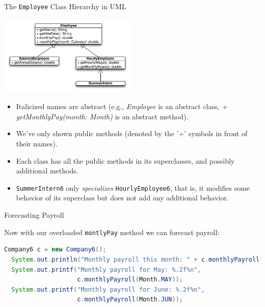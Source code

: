\documentclass{beamer}
\begin{document}
\begin{frame}[fragile]{The {\tt Employee} Class Hierarchy in UML}


\vspace{-.2in}
\begin{center}
\includegraphics[height=1.5in]{employee-uml.pdf}
\end{center}
\vspace{-.25in}
\begin{itemize}
\item Italicized names are abstract (e.g., {\it Employee} is an abstract class, {\it + getMonthlyPay(month: Month)} is an abstract method).
\item We've only shown public methods (denoted by the '+' symbols in front of their names).
\item Each class has all the public methods in its superclasses, and possibly additional methods.
\item {\tt SummerIntern6} only {\it specializes} {\tt HourlyEmployee6}, that is, it modifies some behavior of its superclass but does not add any additional behavior.
\end{itemize}


\end{frame}

\begin{frame}[fragile]{Forecasting Payroll}


Now with our overloaded  {\tt montlyPay} method we can forecast payroll:
\begin{lstlisting}[language=Java]
  Company6 c = new Company6();
  System.out.println("Monthly payroll this month: " + c.monthlyPayroll());
  System.out.printf("Monthly payroll for May: %.2f%n",
                    c.monthlyPayroll(Month.MAY));
  System.out.printf("Monthly payroll for June: %.2f%n",
                    c.monthlyPayroll(Month.JUN));
\end{lstlisting}


\end{frame}
\end{document}
